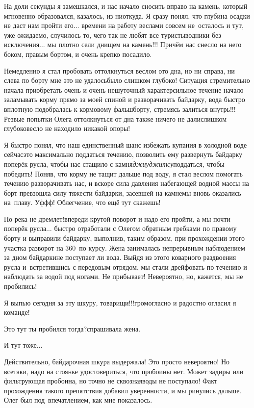 На доли секунды я замешкался, и нас начало сносить вправо на камень, который мгновенно образовался, казалось, из ниоткуда. Я сразу понял, что глубина осадки не даст нам пройти его$\ldots$ времени на работу веслами совсем не~осталось и тут, уже ожидаемо, случилось то, чего так не любят все туристы\sdash водники без исключения$\ldots$ мы плотно сели днищем на камень!!! Причём нас снесло на него боком, правым бортом, и очень крепко посадило. 

Немедленно я стал пробовать оттолкнуться веслом ото дна, но ни справа, ни слева по борту мне это не удалось\mdash было слишком глубоко! Ситуация стремительно начала приобретать очень и очень нешуточный характер\mdash сильное течение начало заламывать корму прямо за моей спиной и разворачивать байдарку, вода быстро вплотную подобралась к кормовому фальшборту, стремясь залиться внутрь!!! Резвые попытки Олега оттолкнуться от дна также ничего не дали\mdash слишком глубоко\mdash весло не находило никакой опоры! 

Я быстро понял, что наш единственный шанс избежать купания в холодной воде сейчас\mdash это максимально поддаться течению, позволить ему развернуть байдарку поперёк русла, чтобы нас стащило с камня\mdash \textit{джиу\sdash джитсу}\mdash поддаться, чтобы победить! Поняв, что корму не тащит дальше под воду, я стал веслом помогать течению разворачивать нас, и вскоре сила давления набегающей водной массы на борт превзошла силу тяжести байдарки, засевшей на камне\mdash мы вновь оказались на~плаву. Уф\sdash ф\sdash ф! Облегчение, что ещё тут скажешь! 

Но река не дремлет!\mdash впереди крутой поворот и надо его пройти, а мы почти поперёк русла$\ldots$ быстро отработали с Олегом обратным гребками по правому борту и выправили байдарку, выполнив, таким образом, при прохождении этого участка разворот на 360\degree~по курсу. Жена занималась непрерывным наблюдением за дном байдарки\mdash не поступает ли вода. Выйдя из этого коварного раздвоения русла и~встретившись с передовым отрядом, мы стали дрейфовать по течению и наблюдать за водой под ногами. Не прибывает! Невероятно, но, кажется, мы не пробились! 

\diagdash Я выпью сегодня за эту шкуру, товарищи!!!\mdash громогласно и радостно огласил я команде!
 
\diagdash Это тут ты пробился тогда?\mdash спрашивала жена.

\diagdash И тут тоже$\ldots$

Действительно, байдарочная шкура выдержала! Это просто невероятно! Но все\sdash таки, надо на стоянке удостовериться, что пробоины нет. Может задиры или фильтрующая пробоина, но точно не сквозная\mdash воды не поступало! Факт прохождения такого препятствия добавил уверенности, и мы ринулись дальше. Олег был под~впечатлением, как мне показалось.

